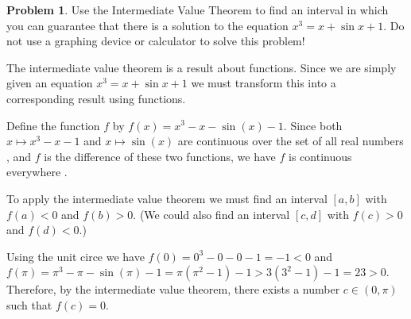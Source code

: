 \documentclass{article}
\theoremstyle{definition}
\newtheorem{Problem}{Problem}
\begin{document}
\begin{Problem}
  Use the Intermediate Value Theorem to find an interval in which you can guarantee that there is a solution to the equation $x^3 = x + \sin x + 1$.
  Do not use a graphing device or calculator to solve this problem!
\end{Problem}
\begin{Solution}
  The intermediate value theorem is a result about functions.
  Since we are simply given an equation $x^3 = x + \sin x + 1$ we must transform this into a corresponding result using functions.

  Define the function $f$ by $f(x) = x^3 - x - \sin(x) - 1$.
  Since both $x \mapsto x^3 - x - 1$ and $x \mapsto \sin(x)$ are continuous over the set of all real numbers \cite[Theorems 2.10 and 2.15]{briggs_calculus_2015}, and $f$ is the difference of these two functions, we have $f$ is continuous everywhere \cite[Theorem 2.9]{briggs_calculus_2015}.

  To apply the intermediate value theorem we must find an interval $[a, b]$ with $f(a) < 0$ and $f(b) > 0$.
  (We could also find an interval $[c, d]$ with $f(c) > 0$ and $f(d) < 0$.)

  Using the unit circe we have $f(0) = 0^3 - 0 - 0 - 1 = -1 < 0$ and $f(\pi) = \pi^3 - \pi - \sin(\pi) - 1 = \pi(\pi^2 - 1) - 1 > 3(3^2 - 1) - 1 = 23 > 0$.
  Therefore, by the intermediate value theorem, there exists a number $c \in (0, \pi)$ such that $f(c) = 0$.


  \end{Solution}
\printbibliography
\end{document}
